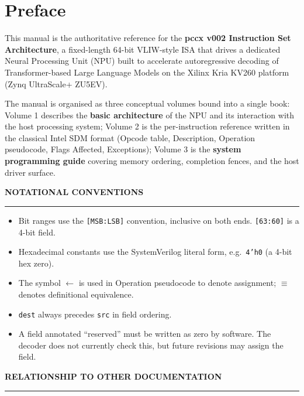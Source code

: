 \documentclass[11pt,a4paper,twoside,openany]{report}
\newcommand{\RefSection}[1]{%
  \par\medskip
  {\sffamily\bfseries\color{oceanblue}\normalsize\MakeUppercase{#1}}
  \par\vspace{-0.4em}
  {\color{oceanblue}\rule{\linewidth}{0.4pt}}\par\smallskip
}
\begin{document}

\chapter*{Preface}

This manual is the authoritative reference for the
\textbf{\color{oceanblue}pccx v002 Instruction Set Architecture}, a
fixed-length 64-bit VLIW-style ISA that drives a dedicated Neural
Processing Unit (NPU) built to accelerate autoregressive decoding of
Transformer-based Large Language Models on the Xilinx Kria KV260
platform (Zynq UltraScale+ ZU5EV).

The manual is organised as three conceptual volumes bound into a
single book: Volume 1 describes the \textbf{basic architecture} of
the NPU and its interaction with the host processing system; Volume 2
is the per-instruction reference written in the classical Intel SDM
format (Opcode table, Description, Operation pseudocode, Flags
Affected, Exceptions); Volume 3 is the \textbf{system programming
guide} covering memory ordering, completion fences, and the host
driver surface.

\RefSection{Notational Conventions}

\begin{itemize}[label={\color{oceanblue}\textbullet}, leftmargin=*, itemsep=0.3ex]
  \item Bit ranges use the \texttt{[MSB:LSB]} convention, inclusive on
        both ends. \texttt{[63:60]} is a 4-bit field.
  \item Hexadecimal constants use the SystemVerilog literal form,
        e.g.\ \texttt{4'h0} (a 4-bit hex zero).
  \item The symbol $\gets$ is used in Operation pseudocode to denote
        assignment; $\equiv$ denotes definitional equivalence.
  \item \texttt{dest} always precedes \texttt{src} in field ordering.
  \item A field annotated ``reserved'' must be written as zero by
        software. The decoder does not currently check this, but future
        revisions may assign the field.
\end{itemize}

\RefSection{Relationship to Other Documentation}
\end{document}
